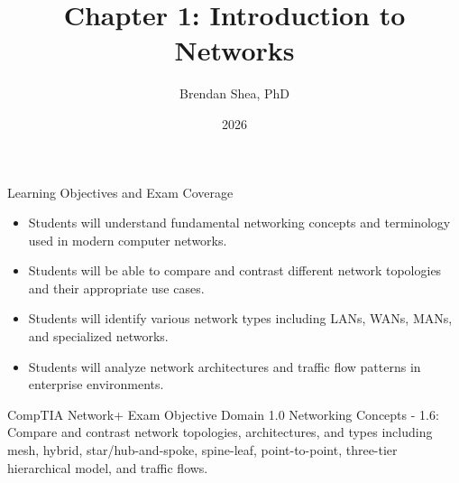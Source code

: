 \documentclass[aspectratio=169]{beamer}
\title{Chapter 1: Introduction to Networks}
\author{Brendan Shea, PhD}
\institute{Introduction to Networking}
\date{2026}
\begin{document}
	
	\begin{frame}
		\titlepage
	\end{frame}
	
	\begin{frame}{Learning Objectives and Exam Coverage}
		\begin{itemize}
			\item Students will understand fundamental networking concepts and terminology used in modern computer networks.
			\item Students will be able to compare and contrast different network topologies and their appropriate use cases.
			\item Students will identify various network types including LANs, WANs, MANs, and specialized networks.
			\item Students will analyze network architectures and traffic flow patterns in enterprise environments.
		\end{itemize}
		
		\begin{alertblock}{CompTIA Network+ Exam Objective}
			Domain 1.0 Networking Concepts - 1.6: Compare and contrast network topologies, architectures, and types including mesh, hybrid, star/hub-and-spoke, spine-leaf, point-to-point, three-tier hierarchical model, and traffic flows.
		\end{alertblock}
	\end{frame}
	
\end{document}
